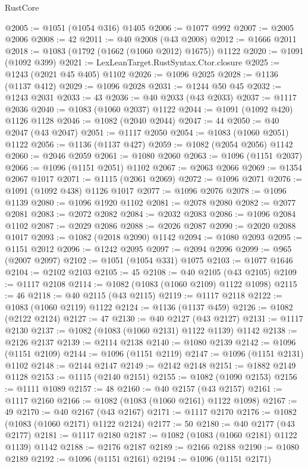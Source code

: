 \begin{lexlean}{RustCore}
\begin{coremodule}
@2005 := @1051 (@1054 @316) @1405
@2006 := @1077 @992
@2007 := @2005 @2006
@2008 := 42
@2011 := @40 @2008 (@43 @2008)
@2012 := @1666 @2011
@2018 := @1083 (@1792 (@1662 (@1060 @2012) @1675)) @1122
@2020 := @1091 (@1092 @399)
@2021 := LexLeanTarget.RustSyntax.Ctor.closure
@2025 := @1243 (@2021 @45 @405) @1102
@2026 := @1096 @2025
@2028 := @1136 (@1137 @412)
@2029 := @1096 @2028
@2031 := @1244 @50 @45
@2032 := @1243 @2031
@2033 := 43
@2036 := @40 @2033 (@43 @2033)
@2037 := @1117 @2036
@2040 := @1083 (@1060 @2037) @1122
@2044 := @1091 (@1092 @420) @1126 @1128
@2046 := @1082 (@2040 @2044)
@2047 := 44
@2050 := @40 @2047 (@43 @2047)
@2051 := @1117 @2050
@2054 := @1083 (@1060 @2051) @1122
@2056 := @1136 (@1137 @427)
@2059 := @1082 (@2054 @2056) @1142
@2060 := @2046 @2059
@2061 := @1080 @2060
@2063 := @1096 (@1151 @2037)
@2066 := @1096 (@1151 @2051) @1102
@2067 := @2063 @2066
@2069 := @1354 @2067 @1017
@2071 := @1115 (@2061 @2069)
@2072 := @1096 @2071
@2076 := @1091 (@1092 @438) @1126 @1017
@2077 := @1096 @2076
@2078 := @1096 @1139
@2080 := @1096 @1920 @1102
@2081 := @2078 @2080
@2082 := @2077 @2081
@2083 := @2072 @2082
@2084 := @2032 @2083
@2086 := @1096 @2084 @1102
@2087 := @2029 @2086
@2088 := @2026 @2087
@2090 := @2020 @2088 @1017
@2093 := @1082 (@2018 @2090) @1142
@2094 := @1080 @2093
@2095 := @1151 @2012
@2096 := @1242 @2095
@2097 := @2094 @2096
@2099 := @965 (@2007 @2097)
@2102 := @1051 (@1054 @331) @1075
@2103 := @1077 @1646
@2104 := @2102 @2103
@2105 := 45
@2108 := @40 @2105 (@43 @2105)
@2109 := @1117 @2108
@2114 := @1082 (@1083 (@1060 @2109) @1122 @1098)
@2115 := 46
@2118 := @40 @2115 (@43 @2115)
@2119 := @1117 @2118
@2122 := @1083 (@1060 @2119) @1122
@2124 := @1136 (@1137 @459)
@2126 := @1082 (@2122 @2124)
@2127 := 47
@2130 := @40 @2127 (@43 @2127)
@2131 := @1117 @2130
@2137 := @1082 (@1083 (@1060 @2131) @1122 @1139) @1142
@2138 := @2126 @2137
@2139 := @2114 @2138
@2140 := @1080 @2139
@2142 := @1096 (@1151 @2109)
@2144 := @1096 (@1151 @2119)
@2147 := @1096 (@1151 @2131) @1102
@2148 := @2144 @2147
@2149 := @2142 @2148
@2151 := @1882 @2149 @1128
@2153 := @1115 (@2140 @2151)
@2155 := @1082 (@1090 @2153)
@2156 := @1111 @1089
@2157 := 48
@2160 := @40 @2157 (@43 @2157)
@2161 := @1117 @2160
@2166 := @1082 (@1083 (@1060 @2161) @1122 @1098)
@2167 := 49
@2170 := @40 @2167 (@43 @2167)
@2171 := @1117 @2170
@2176 := @1082 (@1083 (@1060 @2171) @1122 @2124)
@2177 := 50
@2180 := @40 @2177 (@43 @2177)
@2181 := @1117 @2180
@2187 := @1082 (@1083 (@1060 @2181) @1122 @1139) @1142
@2188 := @2176 @2187
@2189 := @2166 @2188
@2190 := @1080 @2189
@2192 := @1096 (@1151 @2161)
@2194 := @1096 (@1151 @2171)

\end{coremodule}
\end{lexlean}
